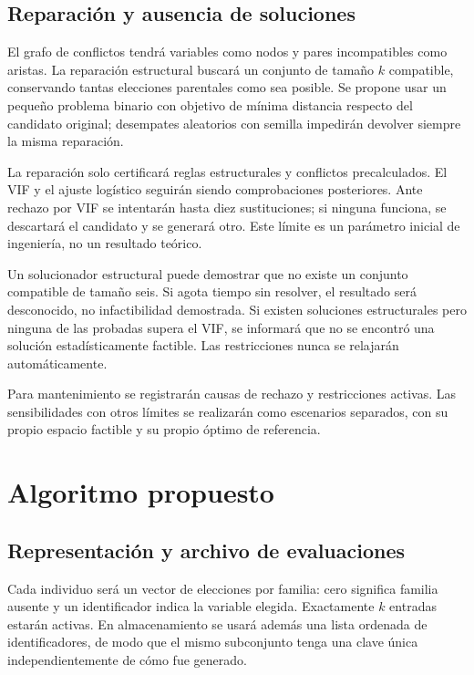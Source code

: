 \documentclass[11pt,letterpaper]{article}
\begin{document}
\subsection{Reparación y ausencia de soluciones}\label{sec:5.3}

El grafo de conflictos tendrá variables como nodos y pares incompatibles como aristas. La reparación estructural buscará un conjunto de tamaño \(k\) compatible, conservando tantas elecciones parentales como sea posible. Se propone usar un pequeño problema binario con objetivo de mínima distancia respecto del candidato original; desempates aleatorios con semilla impedirán devolver siempre la misma reparación.

La reparación solo certificará reglas estructurales y conflictos precalculados. El VIF y el ajuste logístico seguirán siendo comprobaciones posteriores. Ante rechazo por VIF se intentarán hasta diez sustituciones; si ninguna funciona, se descartará el candidato y se generará otro. Este límite es un parámetro inicial de ingeniería, no un resultado teórico.

Un solucionador estructural puede demostrar que no existe un conjunto compatible de tamaño seis. Si agota tiempo sin resolver, el resultado será desconocido, no infactibilidad demostrada. Si existen soluciones estructurales pero ninguna de las probadas supera el VIF, se informará que no se encontró una solución estadísticamente factible. Las restricciones nunca se relajarán automáticamente.

Para mantenimiento se registrarán causas de rechazo y restricciones activas. Las sensibilidades con otros límites se realizarán como escenarios separados, con su propio espacio factible y su propio óptimo de referencia.

\section{Algoritmo propuesto}\label{sec:6}

\subsection{Representación y archivo de evaluaciones}\label{sec:6.1}

Cada individuo será un vector de elecciones por familia: cero significa familia ausente y un identificador indica la variable elegida. Exactamente \(k\) entradas estarán activas. En almacenamiento se usará además una lista ordenada de identificadores, de modo que el mismo subconjunto tenga una clave única independientemente de cómo fue generado.
\end{document}
